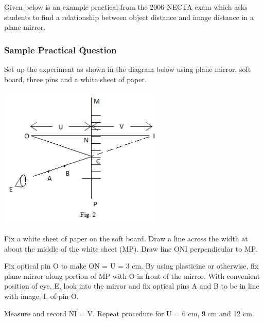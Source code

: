 Given below is an example practical from the 2006 NECTA exam which asks students to find a relationship between object distance and image distance in a plane mirror.

\subsubsection{Sample Practical Question}

Set up the experiment as shown in the diagram below using plane mirror, soft board, three pins and a white sheet of paper.

\begin{center}
\includegraphics[width=8cm]{./img/2006-2-alt.png}
\end{center}

Fix a white sheet of paper on the soft board. Draw a line across the width at about the middle of the white sheet (MP). Draw line ONI perpendicular to MP.

Fix optical pin O to make ON = U = 3 cm. By using plasticine or otherwise, fix plane mirror along portion of MP with O in front of the mirror. With convenient position of eye, E, look into the mirror and fix optical pins A and B to be in line with image, I, of pin O.

Measure and record NI = V. Repeat procedure for U = 6 cm, 9 cm and 12 cm.

